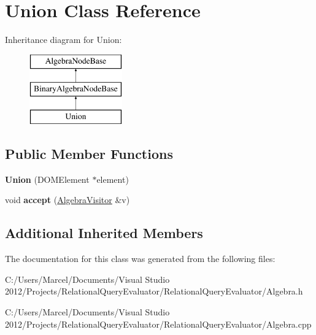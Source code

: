 \hypertarget{class_union}{\section{Union Class Reference}
\label{class_union}
}
Inheritance diagram for Union\+:\begin{figure}[H]
\begin{center}
\leavevmode
\includegraphics[height=3.000000cm]{class_union}
\end{center}
\end{figure}
\subsection*{Public Member Functions}
\begin{DoxyCompactItemize}
\item 
\hypertarget{class_union_a092a85229eefb0a218bec53bd12b9433}{{\bfseries Union} (D\+O\+M\+Element $\ast$element)}\label{class_union_a092a85229eefb0a218bec53bd12b9433}

\item 
\hypertarget{class_union_a3a6b25cdee04be26d42e6f531e358e34}{void {\bfseries accept} (\hyperlink{class_algebra_visitor}{Algebra\+Visitor} \&v)}\label{class_union_a3a6b25cdee04be26d42e6f531e358e34}

\end{DoxyCompactItemize}
\subsection*{Additional Inherited Members}


The documentation for this class was generated from the following files\+:\begin{DoxyCompactItemize}
\item 
C\+:/\+Users/\+Marcel/\+Documents/\+Visual Studio 2012/\+Projects/\+Relational\+Query\+Evaluator/\+Relational\+Query\+Evaluator/Algebra.\+h\item 
C\+:/\+Users/\+Marcel/\+Documents/\+Visual Studio 2012/\+Projects/\+Relational\+Query\+Evaluator/\+Relational\+Query\+Evaluator/Algebra.\+cpp\end{DoxyCompactItemize}
